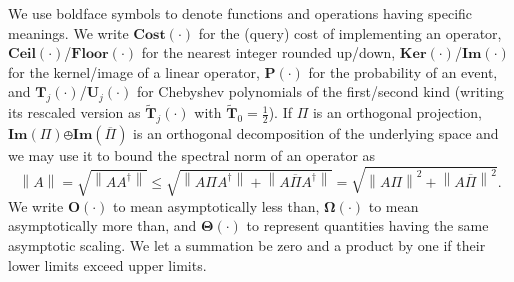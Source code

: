 \documentclass[letterpaper,onecolumn,11pt,accepted=2026-02-14]{quantumarticle}
\newcommand{\norm}[1]{\left\lVert#1\right\rVert}
\theoremstyle{remark}
\theoremstyle{plain}
\begin{document}
We use boldface symbols to denote functions and operations having specific meanings. We write $\mathbf{Cost}(\cdot)$ for the (query) cost of implementing an operator, $\mathbf{Ceil}(\cdot)$/$\mathbf{Floor}(\cdot)$ for the nearest integer rounded up/down, $\mathbf{Ker}(\cdot)$/$\mathbf{Im}(\cdot)$ for the kernel/image of a linear operator, $\mathbf{P}(\cdot)$ for the probability of an event, and $\mathbf{T}_j(\cdot)$/$\mathbf{U}_j(\cdot)$ for Chebyshev polynomials of the first/second kind (writing its rescaled version as $\widetilde{\mathbf{T}}_j(\cdot)$ with $\widetilde{\mathbf{T}}_0=\frac{1}{2}$).
If $\Pi$ is an orthogonal projection, $\mathbf{Im}(\Pi)\obot\mathbf{Im}(\overline{\Pi})$ is an orthogonal decomposition of the underlying space and we may use it to bound the spectral norm of an operator as
\begin{equation}
    \norm{A}=\sqrt{\norm{AA^\dagger}}
    \leq\sqrt{\norm{A\Pi A^\dagger}+\norm{A\overline{\Pi}A^\dagger}}
    =\sqrt{\norm{A\Pi}^2+\norm{A\overline{\Pi}}^2}.
\end{equation}
We write $\mathbf{O}(\cdot)$ to mean asymptotically less than, $\mathbf{\Omega}(\cdot)$ to mean asymptotically more than, and $\mathbf{\Theta}(\cdot)$ to represent quantities having the same asymptotic scaling.
We let a summation be zero and a product by one if their lower limits exceed upper limits.
\end{document}
